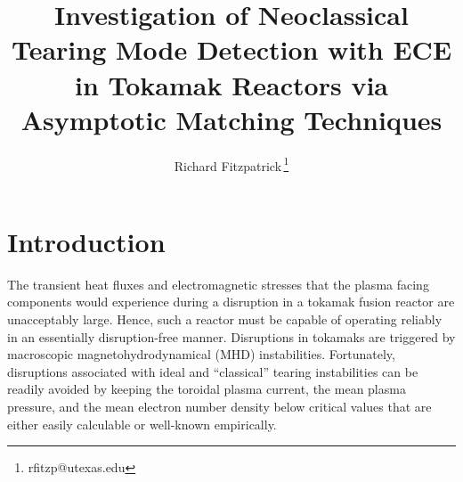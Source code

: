\documentclass[12pt,prb,aps]{revtex4-1}
\begin{document}
\title{Investigation of Neoclassical Tearing Mode Detection with ECE in  Tokamak Reactors via Asymptotic Matching Techniques}
\author{Richard Fitzpatrick\,\footnote{rfitzp@utexas.edu}}

\begin{abstract}
\end{abstract}
\maketitle

\section{Introduction}
The transient heat fluxes and electromagnetic stresses that the plasma facing components would experience during a disruption in
a tokamak fusion reactor are unacceptably large.\cite{iter,wesson}  Hence, such a reactor must be capable of  operating reliably in an essentially disruption-free manner. 
Disruptions in tokamaks are triggered by macroscopic magnetohydrodynamical (MHD) instabilities.\cite{jet} Fortunately, disruptions associated with ideal   and
``classical'' tearing instabilities can   be readily avoided  by keeping the toroidal plasma current, the  mean plasma pressure, and
the mean electron number density below  critical values that are either easily calculable or well-known empirically.\cite{iter}  
\end{document}
